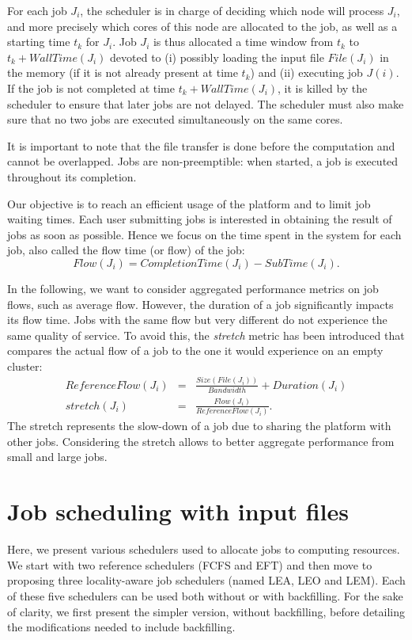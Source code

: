 \documentclass[conference]{IEEEtran}
\newcommand{\file}{\ensuremath{\mathit{File}}\xspace}
\newcommand{\size}{\ensuremath{\mathit{Size}}\xspace}
\newcommand{\duration}{\mathit{Duration}\xspace}
\newcommand{\bandwidth}{\mathit{Bandwidth}\xspace}
\newcommand{\submissiontime}{\mathit{SubTime}\xspace}
\newcommand{\emptyflow}{\mathit{ReferenceFlow}\xspace}
\newcommand{\walltime}{\mathit{WallTime}\xspace}
\newcommand{\completiontime}{\mathit{CompletionTime}\xspace}
\newcommand{\rev}[1]{{\color{black}{#1}}}
\begin{document}
For each job $J_i$, the scheduler is in charge of deciding which node
will process $J_i$, and more precisely which cores of this node
are allocated to the job, as well as a starting time $t_k$ for $J_i$. Job
$J_i$ is thus allocated a time window from $t_k$ to
$t_k+\walltime(J_i)$ devoted to (i) possibly loading the input file
$\file(J_i)$ in the memory (if it is not already present at time
$t_k$) and (ii) executing job $J(i)$. If the job is not completed at
time $t_k+\walltime(J_i)$, it is killed by the scheduler to ensure
that later jobs are not delayed.  The scheduler must also make sure
that no two jobs are executed simultaneously on the same cores.

It is important to note that the file transfer is done before the computation and cannot be overlapped.
Jobs are non-preemptible: when started, a job is executed throughout its completion.

Our objective is to reach an efficient usage of the platform and to
limit job waiting times. Each
user submitting jobs is interested in obtaining the result of jobs
as soon as possible. Hence we focus on the time spent in the system
for each job, also called the flow time (or flow) of the job:
$$
\mathit{Flow}(J_i) = \completiontime(J_i) - \submissiontime(J_i).
$$

In the following, we want to consider aggregated performance metrics on
job flows, such as average flow. However, the duration
of a job significantly impacts its flow time. Jobs with the same
flow but very different \rev{durations} do not experience the same quality
of service. To avoid this, the \emph{stretch} metric has been
introduced that compares the actual flow of a job to the one it would
experience on an empty cluster:
\begin{eqnarray*}
\emptyflow(J_i) &=& \frac{\size(\file(J_i))}{\bandwidth} + \duration(J_i)\\
\mathit{stretch}(J_i) &=& \frac{\mathit{Flow}(J_i)}{\emptyflow(J_i)}.
\end{eqnarray*}
The stretch represents the slow-down of a job due to sharing the
platform with other jobs. Considering the stretch
allows to better aggregate performance from small and large jobs.


\section{Job scheduling with input files}\label{sec.schedulers}


Here, we present various schedulers used to allocate jobs to
computing resources. We start with two reference schedulers (FCFS and EFT)
and then move to proposing three locality-aware job schedulers (named
LEA, LEO and LEM). Each of these five schedulers can be used both
without or with backfilling. For the sake of clarity, we first present
the simpler version, without backfilling, before detailing the
modifications needed to include backfilling.
\end{document}
